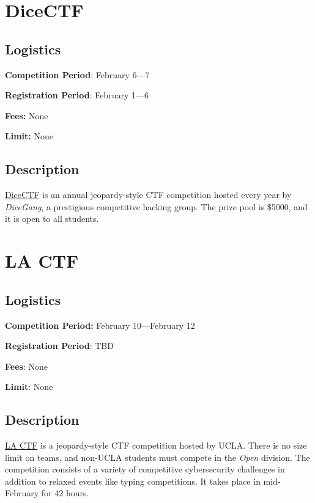 \documentclass[
  letterpaper,
  DIV=11,
  numbers=noendperiod]{scrartcl}
\begin{document}
\hypertarget{dicectf}{%
\section{DiceCTF}\label{dicectf}}

\hypertarget{logistics-3}{%
\subsection{Logistics}\label{logistics-3}}

\textbf{Competition Period}: February 6---7

\textbf{Registration Period}: February 1---6

\textbf{Fees:} None

\textbf{Limit:} None

\hypertarget{description-3}{%
\subsection{Description}\label{description-3}}

\href{https://ctf.dicega.ng/}{DiceCTF} is an annual jeopardy-style CTF
competition hosted every year by \emph{DiceGang}, a prestigious
competitive hacking group. The prize pool is \$5000, and it is open to
all students.

\hypertarget{la-ctf}{%
\section{LA CTF}\label{la-ctf}}

\hypertarget{logistics-4}{%
\subsection{Logistics}\label{logistics-4}}

\textbf{Competition Period:} February 10---February 12

\textbf{Registration Period}: TBD

\textbf{Fees}: None

\textbf{Limit}: None

\hypertarget{description-4}{%
\subsection{Description}\label{description-4}}

\href{https://lactf.uclaacm.com/}{LA CTF} is a jeopardy-style CTF
competition hosted by UCLA. There is no size limit on teams, and
non-UCLA students must compete in the \emph{Open} division. The
competition consists of a variety of competitive cybersecurity
challenges in addition to relaxed events like typing competitions. It
takes place in mid-February for 42 hours.
\end{document}
